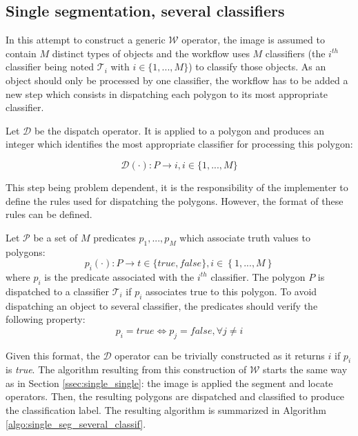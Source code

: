 \subsection{Single segmentation, several classifiers}
\label{ssec:single_several}

In this attempt to construct a generic $\mathcal{W}$ operator, the image is assumed to contain $M$ distinct types of objects and the workflow uses $M$ classifiers (the $i^{th}$ classifier being noted $\mathcal{T}_i$ with $i \in \{1,...,M\}$) to classify those objects. As an object should only be processed by one classifier, the workflow has to be added a new step which consists in dispatching each polygon to its most appropriate classifier. 

\begin{definition}\label{def:dispatch_op} 
	Let $\mathcal{D}$ be the dispatch operator. It is applied to a polygon and produces an integer which identifies the most appropriate classifier for processing this polygon: 

	\begin{equation}
		\mathcal{D}(\cdot) : P \rightarrow i, i \in \{1,...,M\}
	\end{equation}
\end{definition}

This step being problem dependent, it is the responsibility of the implementer to define the rules used for dispatching the polygons. However, the format of these rules can be defined.

\begin{definition} 
	Let $\mathcal{P}$ be a set of $M$ predicates $p_1, ..., p_M$ which associate truth values to polygons:
	\begin{equation}
		p_i(\cdot) : P \rightarrow t \in \{true, false\}, i \in \left\{1,...,M\right\} 
	\end{equation}
	where $p_i$ is the predicate associated with the $i^{th}$ classifier. The polygon $P$ is dispatched to a classifier $\mathcal{T}_i$ if $p_i$ associates true to this polygon. To avoid dispatching an object to several classifier, the predicates should verify the following property:
	\begin{equation}
		p_i = true \Leftrightarrow p_j = false, \forall j \neq i
	\end{equation} 
\end{definition}

Given this format, the $\mathcal{D}$ operator can be trivially constructed as it returns $i$ if $p_i$ is \textit{true}. The algorithm resulting from this construction of $\mathcal{W}$ starts the same way as in Section \ref{ssec:single_single}: the image is applied the segment and locate operators. Then, the resulting polygons are dispatched and classified to produce the classification label. The resulting algorithm is summarized in Algorithm \ref{algo:single_seg_several_classif}. 


